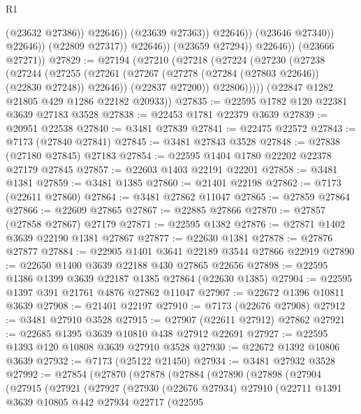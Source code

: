 \begin{lexlean}{R1}
\begin{coremodule}
                                    (@23632 @27386))
                                  @22646))
                              (@23639 @27363))
                            @22646))
                        (@23646 @27340))
                      @22646))
                  (@22809 @27317))
                @22646))
            (@23659 @27294))
          @22646))
      (@23666 @27271))
@27829 := @27194
    (@27210
      (@27218
        (@27224
          (@27230
            (@27238
              (@27244
                (@27255
                  (@27261 (@27267 (@27278 (@27284 (@27803 @22646)) (@22830 @27248)) @22646))
                  (@22837 @27200))
                @22806)))))
      (@22847 @1282 @21805 @429 @1286 @22182 @20933))
@27835 := @22595 @1782 @120 @22381 @3639 @27183 @3528
@27838 := @22453 @1781 @22379 @3639
@27839 := @20951 @22538
@27840 := @3481 @27839
@27841 := @22475 @22572
@27843 := @7173 (@27840 @27841)
@27845 := @3481 @27843 @3528
@27848 := @27838 (@27180 @27845) @27183
@27854 := @22595 @1404 @1780 @22202 @22378 @27179 @27845
@27857 := @22603 @1403 @22191 @22201
@27858 := @3481 @1381
@27859 := @3481 @1385
@27860 := @21401 @22198
@27862 := @7173 (@22611 @27860)
@27864 := @3481 @27862 @11047
@27865 := @27859 @27864
@27866 := @22609 @27865
@27867 := @22885 @27866
@27870 := @27857 (@27858 @27867) @27179
@27871 := @22595 @1382
@27876 := @27871 @1402 @3639 @22190 @1381 @27867
@27877 := @22630 @1381
@27878 := @27876 @27877
@27884 := @22905 @1401 @3641 @22189 @3544 @27866 @22919
@27890 := @22650 @1400 @3639 @22188 @430 @27865 @22656
@27898 := @22595 @1386 @1399 @3639 @22187 @1385 @27864 (@22630 @1385)
@27904 := @22595 @1397 @391 @21761 @4876 @27862 @11047
@27907 := @22672 @1396 @10811 @3639
@27908 := @21401 @22197
@27910 := @7173 (@22676 @27908)
@27912 := @3481 @27910 @3528
@27915 := @27907 (@22611 @27912) @27862
@27921 := @22685 @1395 @3639 @10810 @438 @27912 @22691
@27927 := @22595 @1393 @120 @10808 @3639 @27910 @3528
@27930 := @22672 @1392 @10806 @3639
@27932 := @7173 (@25122 @21450)
@27934 := @3481 @27932 @3528
@27992 := @27854
    (@27870
      (@27878
        (@27884
          (@27890
            (@27898
              (@27904
                (@27915
                  (@27921
                    (@27927
                      (@27930
                        (@22676 @27934)
                        @27910
                        (@22711
                          @1391
                          @3639
                          @10805
                          @442
                          @27934
                          @22717
                          (@22595

\end{coremodule}
\end{lexlean}
